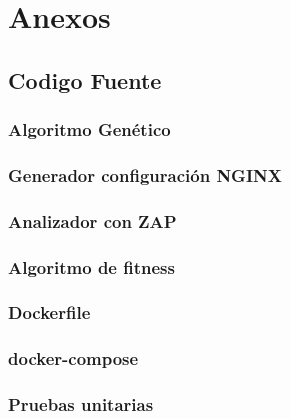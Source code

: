 \chapter{Anexos}

\section{Codigo Fuente}

\subsection{Algoritmo Genético}


\subsection{Generador configuración NGINX}


\subsection{Analizador con ZAP}


\subsection{Algoritmo de fitness}


\newpage
\subsection{Dockerfile}


\subsection{docker-compose}


\subsection{Pruebas unitarias}




